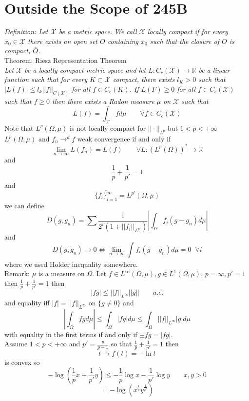 \documentclass[11pt]{article}
\begin{document}
\section{Outside the Scope of 245B}
\emph{
    Definition: Let $ \mathcal{X}$ be a metric space. We call $ \mathcal{X}$ locally compact if for every $x_0 \in \mathcal{X}$
    there exists an open set $O$ containing $ x_0$ such that the closure of $O$ is compact,  $\overline{ O}$.
}
\\
Theorem: Riesz Representation Theorem\\
\emph{
    Let $ \mathcal{X}$ be a locally compact metric space and let $L: C_c( \mathcal{X}) \rightarrow \mathbb{R}$ be a linear function such that
    for every $K \subset \mathcal{X}$ compact, there exists $l_K > 0$ such that  $|L(f)| \le l_k ||f||_{C( \mathcal{X})}$ for all $f \in C_c(K)$.
    If  $L(F) \ge 0$ for all  $f \in C_c( \mathcal{X})$ such that  $f \ge 0$ then there exists a Radon measure $\mu$ on $ \mathcal{X}$ such that
    \[
    L(f) = \int_{ \mathcal{X}}^{}f d \mu \qquad \forall f \in C_c( \mathcal{X})
    \] 
}
Note that $L^{p}(\Omega, \mu)$ is not locally compact for $|| \cdot ||_{L^{p}}$ but $1 < p < +\infty$ $L^{p}(\Omega, \mu)$ and $f_n \rightarrow^{d} f$ weak convergence if and only if
\[
\lim_{n\to \infty}L(f_n) = L(f) \qquad \forall L : (L^{p}(\Omega))^{*} \rightarrow \mathbb{R}
\] 
and
\[
\frac{1}{p} + \frac{1}{p'} = 1
\] 
and
\[
    \overline{\{f_i\}_{i=1}^{\infty}} = L^{p'}(\Omega, \mu)
\] 
we can define
\[
    D(g,g_n) = \sum_{}^{}\frac{1}{2^{i} (1 + ||f_i||_{L^{p'}})} \left|\int_{\Omega}^{}f_i(g-g_n) d \mu\right|
\] 
and
\[
D(g,g_n) \rightarrow 0 \iff \lim_{n\to \infty} \int_{}^{}f_i(g-g_n) d \mu = 0 \;\; \forall i
\] 
where we used Holder inequality somewhere.\\
Remark: $\mu$ is a measure on $\Omega$. Let  $f \in L^{\infty}(\Omega, \mu), g \in L^{1}(\Omega, \mu)$, $p = \infty, p' =1$ then $\frac{1}{p} + \frac{1}{p'} = 1$
then
\[
    |fg| \le ||f||_{L^{\infty}}||g|| \qquad a.e.
\] 
and equality iff $|f| = ||f||_{L^{\infty}}$ on $\{g \ne 0\}$ and
 \[
     |\int_{\Omega}^{} fg d \mu | \le \int_{\Omega}^{}|fg| d \mu \le \int_{\Omega}^{}||f||_{L^{\infty}} |g| d \mu
\] 
with equality in the first terms if and only if $\pm fg = |fg|$.
\\
Assume $1 < p < +\infty$ and $p' = \frac{p}{p-1}$ so that $\frac{1}{p} + \frac{1}{p'} = 1$ then
\[
t \rightarrow f(t) = -\ln t 
\] 
is convex so
\[
-\log(\frac{1}{p}x + \frac{1}{p'}y) \le -\frac{1}{p}\log x - \frac{1}{p'} \log y \qquad x,y > 0
\] 
\[
= -\log (x^{\frac{1}{p}}y^{\frac{1}{p'}})
\] 
\end{document}
